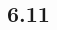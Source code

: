\documentclass{article}
\begin{document}
\begin{CJK*}{GBK}{song}
 
 \section{6.11}
 
 
 
 
 
 
 
 
 
 
 
 
 
 
 
\end{CJK*}
\end{document}
